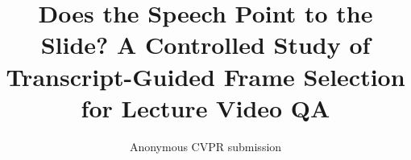 \documentclass[10pt,twocolumn,letterpaper]{article}
\title{Does the Speech Point to the Slide? A Controlled Study of\\Transcript-Guided Frame Selection for Lecture Video QA}
\author{Anonymous CVPR submission}
\begin{document}
\maketitlesupplementary

{
    \small
    
    
}
\end{document}
